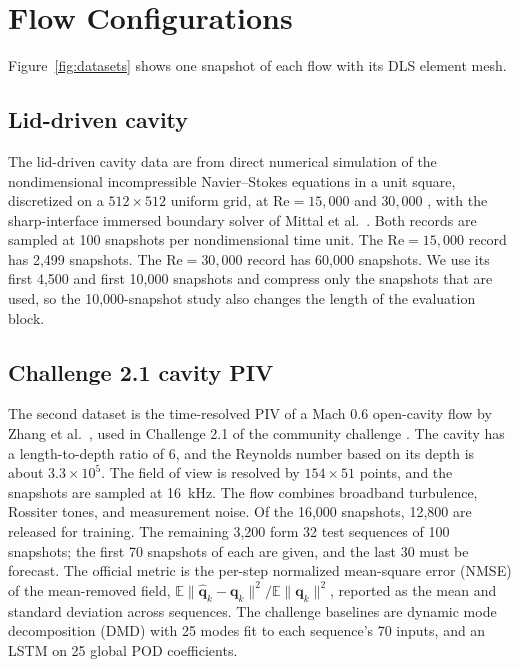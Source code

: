 \documentclass[conf]{new-aiaa}
\newcommand{\Rey}{\mathrm{Re}}
\begin{document}
\section{Flow Configurations}
\label{sec:flows}
Figure~\ref{fig:datasets} shows one snapshot of each flow with its DLS element mesh.


\subsection{Lid-driven cavity}
The lid-driven cavity data are from direct numerical simulation of the nondimensional incompressible Navier--Stokes equations in a unit square, discretized on a $512\times512$ uniform grid, at $\Rey=15{,}000$ and $30{,}000$ \cite{deshmukh2016sparse,morton2026scitech}, with the sharp-interface immersed boundary solver of Mittal et al.~\cite{mittal2008versatile}. Both records are sampled at 100 snapshots per nondimensional time unit. The $\Rey=15{,}000$ record has 2,499 snapshots. The $\Rey=30{,}000$ record has 60,000 snapshots. We use its first 4,500 and first 10,000 snapshots and compress only the snapshots that are used, so the 10,000-snapshot study also changes the length of the evaluation block.

\subsection{Challenge 2.1 cavity PIV}
\label{sec:challenge}
The second dataset is the time-resolved PIV of a Mach 0.6 open-cavity flow by Zhang et al.~\cite{zhang2020samm}, used in Challenge 2.1 of the community challenge \cite{schmidt2026challenge}. The cavity has a length-to-depth ratio of 6, and the Reynolds number based on its depth is about $3.3\times10^5$. The field of view is resolved by $154\times51$ points, and the snapshots are sampled at 16~kHz. The flow combines broadband turbulence, Rossiter tones, and measurement noise. Of the 16,000 snapshots, 12,800 are released for training. The remaining 3,200 form 32 test sequences of 100 snapshots; the first 70 snapshots of each are given, and the last 30 must be forecast. The official metric is the per-step normalized mean-square error (NMSE) of the mean-removed field, $\mathbb{E}\|\hat{\mathbf{q}}_k-\mathbf{q}_k\|^2/\mathbb{E}\|\mathbf{q}_k\|^2$, reported as the mean and standard deviation across sequences. The challenge baselines are dynamic mode decomposition (DMD) \cite{schmid2010dmd} with 25 modes fit to each sequence's 70 inputs, and an LSTM on 25 global POD coefficients.
\end{document}
